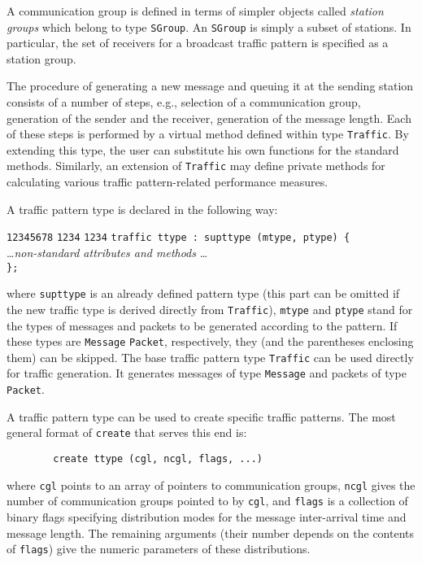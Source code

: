 A communication group is defined in terms of simpler objects called
{\em station groups} which belong to type {\tt SGroup}.
An {\tt SGroup} is simply a subset of stations.
In particular,
the set of receivers for a broadcast traffic pattern is specified as a
station group.

The procedure of generating a new message and queuing it at the sending
station consists of a number of steps, e.g.,
selection of a communication group, generation of the sender and the
receiver, generation of the message length.
Each of these steps is performed by a virtual method defined within type
{\tt Traffic}.
By extending this type, the user can substitute his own functions for
the standard methods.
Similarly, an extension of {\tt Traffic} may define private methods for
calculating various traffic pattern-related performance measures.

A traffic pattern type is declared in the following way:
{\small
\begin{tabbing}
{\tt 12345678} \= {\tt 1234} \= {\tt 1234} \kill
\> {\tt traffic ttype : supttype (mtype, ptype) \{} \\
\> \> \ldots {\em non-standard attributes and methods} \ldots \\
\> {\tt \};}
\end{tabbing} }
\noindent
where {\tt supttype} is an already defined pattern type (this part can be
omitted if the new traffic type is derived directly from {\tt Traffic}),
{\tt mtype} and {\tt ptype} stand
for the types of messages and packets to be generated according to
the pattern.
If these types are {\tt Message} {\tt Packet}, respectively, they (and
the parentheses enclosing them) can be skipped.
The base traffic pattern type {\tt Traffic} can be used directly for
traffic generation.
It generates messages of type {\tt Message} and packets of type
{\tt Packet}.

A traffic pattern type can be used to create specific traffic patterns.
The most general format of {\tt create} that serves this end is:
{\small
\begin{verbatim}
        create ttype (cgl, ncgl, flags, ...)
\end{verbatim} }
\noindent
where {\tt cgl} points to an array of pointers to communication groups,
{\tt ncgl} gives the number of communication groups pointed to by {\tt cgl},
and {\tt flags} is a collection of binary flags specifying distribution
modes for the message inter-arrival time and message length.
The remaining arguments (their number depends on the contents of {\tt flags})
give the numeric parameters of these distributions.

